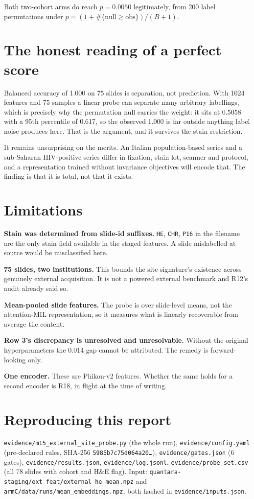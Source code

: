 \documentclass[11pt,a4paper]{article}
\begin{document}
Both two-cohort arms do reach $p = 0.0050$ legitimately, from 200 label permutations under
$p = (1 + \#\{\text{null} \geq \text{obs}\})/(B+1)$.

\section{The honest reading of a perfect score}

Balanced accuracy of 1.000 on 75 slides is separation, not prediction. With 1024 features and 75
samples a linear probe can separate many arbitrary labellings, which is precisely why the
permutation null carries the weight: it sits at 0.5058 with a 95th percentile of 0.617, so the
observed 1.000 is far outside anything label noise produces here. That is the argument, and it
survives the stain restriction.

It remains unsurprising on the merits. An Italian population-based series and a sub-Saharan
HIV-positive series differ in fixation, stain lot, scanner and protocol, and a representation
trained without invariance objectives will encode that. The finding is that it is total, not that
it exists.

\section{Limitations}

\textbf{Stain was determined from slide-id suffixes.} \texttt{HE}, \texttt{CHR}, \texttt{P16} in
the filename are the only stain field available in the staged features. A slide mislabelled at
source would be misclassified here.

\textbf{75 slides, two institutions.} This bounds the site signature's existence across genuinely
external acquisition. It is not a powered external benchmark and R12's audit already said so.

\textbf{Mean-pooled slide features.} The probe is over slide-level means, not the attention-MIL
representation, so it measures what is linearly recoverable from average tile content.

\textbf{Row 3's discrepancy is unresolved and unresolvable.} Without the original
hyperparameters the 0.014 gap cannot be attributed. The remedy is forward-looking only.

\textbf{One encoder.} These are Phikon-v2 features. Whether the same holds for a second encoder is
R18, in flight at the time of writing.

\section*{Reproducing this report}

\texttt{evidence/m15\_external\_site\_probe.py} (the whole run),
\texttt{evidence/config.yaml} (pre-declared rules, SHA-256
\texttt{5985b7c75d064a20\ldots}), \texttt{evidence/gates.json} (6 gates),
\texttt{evidence/results.json}, \texttt{evidence/log.jsonl},
\texttt{evidence/probe\_set.csv} (all 78 slides with cohort and H\&E flag).
Input: \texttt{quantara-staging/ext\_feat/external\_he\_mean.npz} and
\texttt{armC/data/runs/mean\_embeddings.npz}, both hashed in
\texttt{evidence/inputs.json}.
\end{document}
